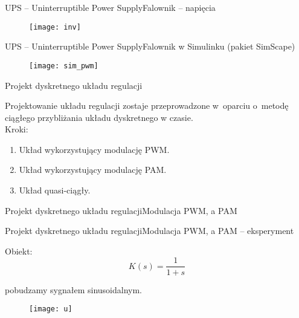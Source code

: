 \documentclass[11pt]{beamer}
\begin{document}
\begin{frame}{UPS -- Uninterruptible Power Supply}{Falownik -- napięcia}

\begin{figure}[htbp!]
	\centering
	\texttt{[image: inv]}
\end{figure}

\end{frame}


\begin{frame}{UPS -- Uninterruptible Power Supply}{Falownik w Simulinku (pakiet SimScape)}

\begin{figure}[htbp!]
	\centering
	\texttt{[image: sim\_pwm]}
\end{figure}

\end{frame}


\begin{frame}{Projekt dyskretnego układu regulacji}

Projektowanie układu regulacji zostaje przeprowadzone w~oparciu o~metodę ciągłego
przybliżania układu dyskretnego w czasie.\\[10pt]

Kroki:
\begin{enumerate}
\item Układ wykorzystujący modulację PWM.
\item Układ wykorzystujący modulację PAM.
\item Układ quasi-ciągły.
\end{enumerate}

\end{frame}


\begin{frame}{Projekt dyskretnego układu regulacji}{Modulacja PWM, a PAM}

\begin{figure}[htbp!]
	\centering
	
	\hfill%
\end{figure}

\end{frame}


\begin{frame}{Projekt dyskretnego układu regulacji}{Modulacja PWM, a PAM -- eksperyment}

Obiekt:
\[
K(s) = \frac{1}{1 + s}
\]

pobudzamy sygnałem sinusoidalnym.

\begin{figure}[htbp!]
	\centering
	\texttt{[image: u]}
\end{figure}

\end{frame}
\end{document}
